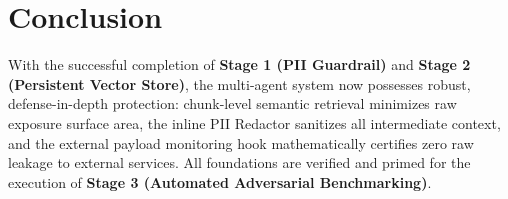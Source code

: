 \documentclass[10pt,a4paper]{article}
\begin{document}
\section{Conclusion}
With the successful completion of \textbf{Stage 1 (PII Guardrail)} and \textbf{Stage 2 (Persistent Vector Store)}, the multi-agent system now possesses robust, defense-in-depth protection: chunk-level semantic retrieval minimizes raw exposure surface area, the inline PII Redactor sanitizes all intermediate context, and the external payload monitoring hook mathematically certifies zero raw leakage to external services. All foundations are verified and primed for the execution of \textbf{Stage 3 (Automated Adversarial Benchmarking)}.
\end{document}
